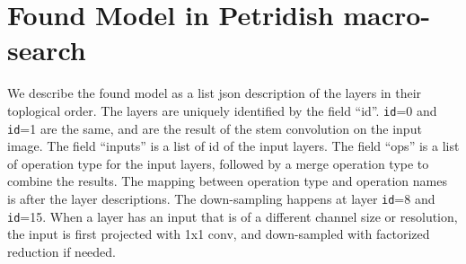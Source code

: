 \documentclass{article}
\newcommand{\Petridish}{Petridish\xspace}
\begin{document}
\section{Found Model in \Petridish macro-search}
We describe the found model as a list json description of the layers in their toplogical order.
The layers are uniquely identified by the field ``id''. \verb=id==0 and \verb=id==1 are the same, and are the result of the stem convolution on the input image. The field ``inputs'' is a list of id of the input layers.
The field ``ops'' is a list of operation type for the input layers, followed by a merge operation type to combine the results. The mapping between operation type and operation names is after the layer descriptions.
The down-sampling happens at layer \verb=id==8 and \verb=id==15. When a layer has an input that is of a different channel size or resolution, the input is first projected with 1x1 conv, and down-sampled with factorized reduction if needed. 
\end{document}
